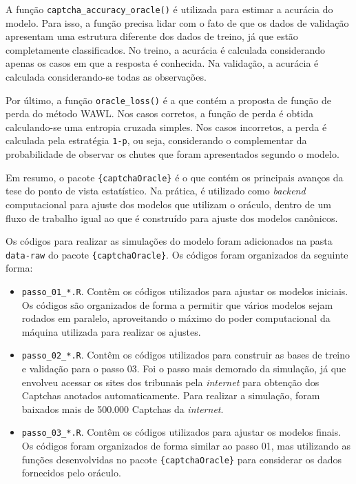 \documentclass[12pt,twoside,brazilian]{book}
\providecommand{\tightlist}{%
  \setlength{\itemsep}{0pt}\setlength{\parskip}{0pt}}
\begin{document}
A função \texttt{captcha\_accuracy\_oracle()} é utilizada para estimar a
acurácia do modelo. Para isso, a função precisa lidar com o fato de que
os dados de validação apresentam uma estrutura diferente dos dados de
treino, já que estão completamente classificados. No treino, a acurácia
é calculada considerando apenas os casos em que a resposta é conhecida.
Na validação, a acurácia é calculada considerando-se todas as
observações.

Por último, a função \texttt{oracle\_loss()} é a que contém a proposta
de função de perda do método WAWL. Nos casos corretos, a função de perda
é obtida calculando-se uma entropia cruzada simples. Nos casos
incorretos, a perda é calculada pela estratégia \texttt{1-p}, ou seja,
considerando o complementar da probabilidade de observar os chutes que
foram apresentados segundo o modelo.

Em resumo, o pacote \texttt{\{captchaOracle\}} é o que contém os
principais avanços da tese do ponto de vista estatístico. Na prática, é
utilizado como \emph{backend} computacional para ajuste dos modelos que
utilizam o oráculo, dentro de um fluxo de trabalho igual ao que é
construído para ajuste dos modelos canônicos.

Os códigos para realizar as simulações do modelo foram adicionados na
pasta \texttt{data-raw} do pacote \texttt{\{captchaOracle\}}. Os códigos
foram organizados da seguinte forma:

\begin{itemize}
\tightlist
\item
  \texttt{passo\_01\_*.R}. Contêm os códigos utilizados para ajustar os
  modelos iniciais. Os códigos são organizados de forma a permitir que
  vários modelos sejam rodados em paralelo, aproveitando o máximo do
  poder computacional da máquina utilizada para realizar os ajustes.
\item
  \texttt{passo\_02\_*.R}. Contêm os códigos utilizados para construir
  as bases de treino e validação para o passo 03. Foi o passo mais
  demorado da simulação, já que envolveu acessar os sites dos tribunais
  pela \emph{internet} para obtenção dos Captchas anotados
  automaticamente. Para realizar a simulação, foram baixados mais de
  500.000 Captchas da \emph{internet}.
\item
  \texttt{passo\_03\_*.R}. Contêm os códigos utilizados para ajustar os
  modelos finais. Os códigos foram organizados de forma similar ao passo
  01, mas utilizando as funções desenvolvidas no pacote
  \texttt{\{captchaOracle\}} para considerar os dados fornecidos pelo
  oráculo.
\end{itemize}
\end{document}
